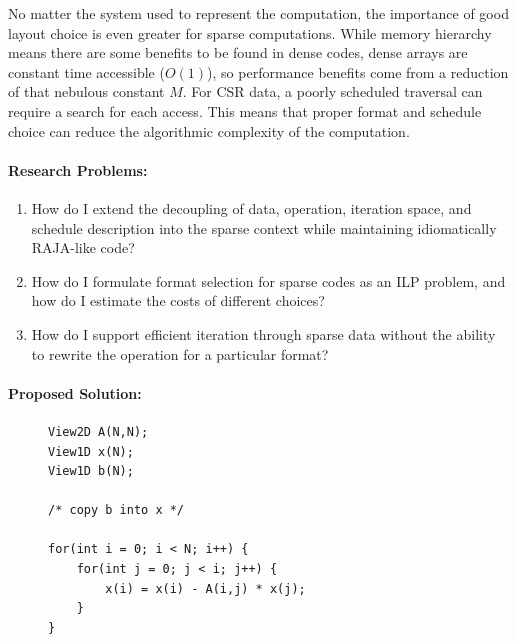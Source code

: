 \documentclass{article}
\begin{document}
No matter the system used to represent the computation, the importance of good layout choice is even greater for sparse computations.
While memory hierarchy means there are some benefits to be found in dense codes, dense arrays are constant time accessible ($O(1)$), so performance benefits come from a reduction of that nebulous constant $M$.
For CSR data, a poorly scheduled traversal can require a search for each access.
This means that proper format and schedule choice can reduce the algorithmic complexity of the computation.


\paragraph{Research Problems:}
\begin{enumerate}[label=Q3.\arabic*]
    \item How do I extend the decoupling of data, operation, iteration space, and schedule description into the sparse context while maintaining idiomatically RAJA-like code?
    \item How do I formulate format selection for sparse codes as an ILP problem, and how do I estimate the costs of different choices?
    \item How do I support efficient iteration through sparse data without the ability to rewrite the operation for a particular format? 
\end{enumerate}


\paragraph{Proposed Solution:}


\begin{figure}
\begin{lstlisting}[label={ForwardSolveC},caption={C-like implementation of forward substitution using Views}]
View2D A(N,N);
View1D x(N);
View1D b(N);

/* copy b into x */

for(int i = 0; i < N; i++) {
    for(int j = 0; j < i; j++) {
        x(i) = x(i) - A(i,j) * x(j);
    }
}
\end{lstlisting}
\end{figure}
\end{document}
